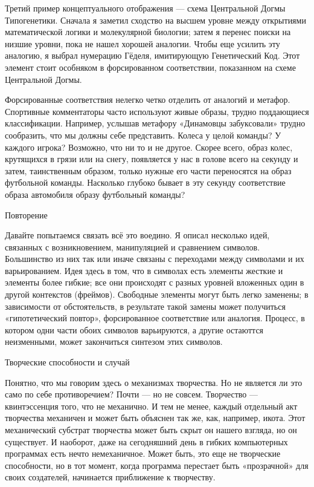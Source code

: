 \documentclass[../main.tex]{subfiles}
\begin{document}
Третий пример концептуального отображения --- схема Центральной Догмы Типогенетики. Сначала я заметил сходство на высшем уровне между открытиями математической логики и молекулярной биологии; затем я перенес поиски на низшие уровни, пока не нашел хорошей аналогии. Чтобы еще усилить эту аналогию, я выбрал нумерацию Гёделя, имитирующую Генетический Код. Этот элемент стоит особняком в форсированном соответствии, показанном на схеме Центральной Догмы.

Форсированные соответствия нелегко четко отделить от аналогий и метафор. Спортивные комментаторы часто используют живые образы, трудно поддающиеся классификации. Например, услышав метафору «Динамовцы забуксовали» трудно сообразить, что мы должны себе представить. Колеса у целой команды? У каждого игрока? Возможно, что ни то и не другое. Скорее всего, образ колес, крутящихся в грязи или на снегу, появляется у нас в голове всего на секунду и затем, таинственным образом, только нужные его части переносятся на образ футбольной команды. Насколько глубоко бывает в эту секунду соответствие образа автомобиля образу футбольный команды?

Повторение

Давайте попытаемся связать всё это воедино. Я описал несколько идей, связанных с возникновением, манипуляцией и сравнением символов. Большинство из них так или иначе связаны с переходами между символами и их варьированием. Идея здесь в том, что в символах есть элементы жесткие и элементы более гибкие; все они происходят с разных уровней вложенных один в другой контекстов (фреймов). Свободные элементы могут быть легко заменены; в зависимости от обстоятельств, в результате такой замены может получиться «гипотетический повтор», форсированное соответствие или аналогия. Процесс, в котором одни части обоих символов варьируются, а другие остаюттся неизменными, может закончиться синтезом этих символов.

Творческие способности и случай

Понятно, что мы говорим здесь о механизмах творчества. Но не является ли это само по себе противоречием? Почти --- но не совсем. Творчество --- квинтэссенция того, что не механично. И тем не менее, каждый отдельный акт творчества механичен и может быть объяснен так же, как, например, икота. Этот механический субстрат творчества может быть скрыт он нашего взгляда, но он существует. И наоборот, даже на сегодняшний день в гибких компьютерных программах есть нечто немеханичное. Может быть, это еще не творческие способности, но в тот момент, когда программа перестает быть «прозрачной» для своих создателей, начинается приближение к творчеству.
\end{document}
